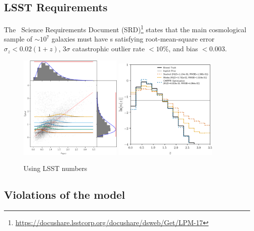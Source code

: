 \subsection{LSST Requirements}

The \lsst\ Science Requirements Document (SRD)\footnote{\url{https://docushare.lsstcorp.org/docushare/dsweb/Get/LPM-17}} states that the main cosmological sample of $\sim 10^{7}$ galaxies must have \pz s satisfying root-mean-square error $\sigma_z < 0.02 (1+z)$, $3 \sigma$ catastrophic outlier rate $< 10\%$, and bias $< 0.003$.

\begin{figure}
	\begin{center}
		\includegraphics[width=0.45\textwidth]{figures/chippr/lsst_scatter.png}
		\includegraphics[width=0.45\textwidth]{figures/chippr/lsst_log_estimators.png}
		\caption{Using LSST numbers}
	\end{center}
\end{figure}


\subsection{Violations of the model}


